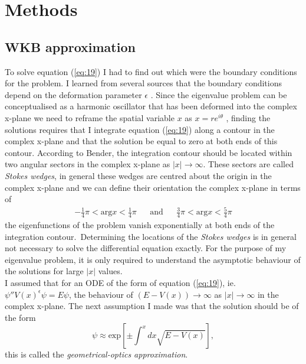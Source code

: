 \documentclass[10pt, a4paper, singlespacing, headsepline]{report}
\begin{document}
\section{Methods}
\subsection{WKB approximation}\label{WKB}
To solve equation (\ref{eq:19}) I had to find out which were the boundary conditions for the problem. I learned from several sources that the boundary conditions depend on the deformation parameter $\epsilon$ \cite{BenderPT}\cite{Bender}\cite{Bender2017}. Since the eigenvalue problem can be conceptualised as a harmonic oscillator that has been deformed into the complex x-plane we need to reframe the spatial variable $x$ as $x = r e^{i\theta}$ , finding the solutions requires that I integrate equation (\ref{eq:19}) along a contour in the complex x-plane and that the solution be equal to zero at both ends of this contour\cite{BenderPT}. According to Bender, the integration contour should be located within two angular sectors in the complex x-plane as $|x| \rightarrow \infty$. These sectors are called \emph{Stokes wedges}\cite{BenderPT}\cite{Bender}, in general these wedges are centred about the origin in the complex x-plane and we can define their orientation the complex x-plane in terms of
\begin{align} \label{eq:20}
&-\frac{1}{4} \pi  < \mathrm{arg}x < \frac{1}{4}\pi& &\mathrm{and}& &\frac{3}{4} \pi  < \mathrm{arg}x < \frac{5}{4}\pi& 
\end{align}
the eigenfunctions of the problem vanish exponentially at both ends of the integration contour.\
Determining the locations of the \emph{Stokes wedges} is in general not necessary to solve the differential equation exactly\cite{BenderPT}. For the purpose of my eigenvalue problem, it is only required to understand the asymptotic behaviour of the solutions for large $|x|$ values.\\
I assumed that for an ODE of the form of equation (\ref{eq:19}), ie. \mbox{$\psi'' V(x)^{\epsilon} \psi = E \psi$}, the behaviour of $(E - V(x)) \rightarrow \infty$ as $|x| \rightarrow \infty$ in the complex x-plane. The next assumption I made was that the solution should be of the form
\begin{equation} \label{eq:21}
\psi \approx \mathrm{exp}[\pm  \int^{x}dx \sqrt{E - V(x)}],
\end{equation}
this is called the \emph{geometrical-optics approximation}\cite{BenderPT}.\\ 
\end{document}
